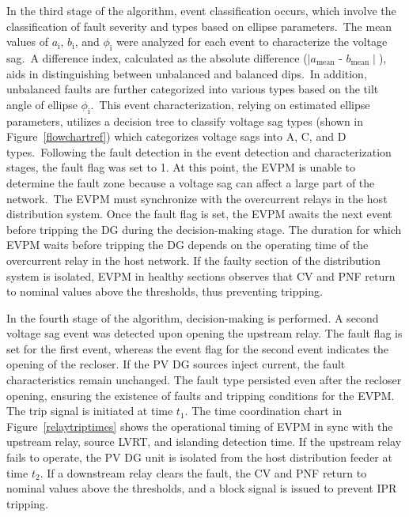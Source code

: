 In the third stage of the algorithm, event classification occurs, which involve the classification of fault severity and types based on ellipse parameters.~The mean values of $a_\text{i}$, $b_\text{i}$, and $\phi_\text{i}$ were analyzed for each event to characterize the voltage sag.~A difference index, calculated as the absolute difference ($ \mid a_\text{mean}$ - $b_\text{mean} \mid $), aids in distinguishing between unbalanced and balanced dips.~In addition, unbalanced faults are further categorized into various types based on the tilt angle of ellipse $\phi_\text{i}$.~This event characterization, relying on estimated ellipse parameters, utilizes a decision tree to classify voltage sag types (shown in Figure~\ref {flowchartref}) which categorizes voltage sags into A, C, and D types.~Following the fault detection in the event detection and characterization stages, the fault flag was set to 1. At this point, the EVPM is unable to determine the fault zone because a voltage sag can affect a large part of the network.~The EVPM must synchronize with the overcurrent relays in the host distribution system. Once the fault flag is set, the EVPM awaits the next event before tripping the DG during the decision-making stage. The duration for which EVPM waits before tripping the DG depends on the operating time of the overcurrent relay in the host network. If the faulty section of the distribution system is isolated, EVPM in healthy sections observes that CV and PNF return to nominal values above the thresholds, thus preventing tripping.

In the fourth stage of the algorithm, decision-making is performed. A second voltage sag event was detected upon opening the upstream relay. The fault flag is set for the first event, whereas the event flag for the second event indicates the opening of the recloser. If the PV DG sources inject current, the fault characteristics remain unchanged. The fault type persisted even after the recloser opening, ensuring the existence of faults and tripping conditions for the EVPM. The trip signal is initiated at time $t_1$. The time coordination chart in Figure~\ref{relaytriptimes} shows the operational timing of EVPM in sync with the upstream relay, source LVRT, and islanding detection time. If the upstream relay fails to operate, the PV DG unit is isolated from the host distribution feeder at time $t_2$. If a downstream relay clears the fault, the CV and PNF return to nominal values above the thresholds, and a block signal is issued to prevent IPR tripping.

